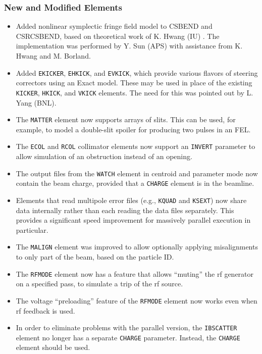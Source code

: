 \documentclass[11pt]{article}
\begin{document}
\subsubsection{New and Modified Elements}
\begin{itemize}
\item Added nonlinear symplectic fringe field model to CSBEND and CSRCSBEND, based on theoretical work of K. Hwang (IU) \cite{KHwang}. The implementation was
  performed by Y. Sun (APS) with assistance from K. Hwang and M. Borland.
\item Added \verb|EKICKER|, \verb|EHKICK|, and \verb|EVKICK|, which provide various flavors of steering correctors using an Exact 
  model. These may be used in place of the existing \verb|KICKER|, \verb|HKICK|, and \verb|VKICK| elements.
  The need for this was pointed out by L. Yang (BNL).
\item The \verb|MATTER| element now supports arrays of slits. This can be used, for example, to model a double-slit spoiler for
  producing two pulses in an FEL.
\item The \verb|ECOL| and \verb|RCOL| collimator elements now support an \verb|INVERT| parameter to allow simulation of an
  obstruction instead of an opening.
\item The output files from the \verb|WATCH| element in centroid and parameter mode now contain the beam charge, provided that
  a \verb|CHARGE| element is in the beamline.
\item Elements that read multipole error files (e.g., \verb|KQUAD| and \verb|KSEXT|) now share data internally rather than each
  reading the data files separately. This provides a significant speed improvement for massively parallel execution in particular.
\item The \verb|MALIGN| element was improved to allow optionally applying misalignments to only part of the beam, based on 
  the particle ID.
\item The \verb|RFMODE| element now has a feature that allows ``muting'' the rf generator on a specified pass, to simulate
  a trip of the rf source. 
\item The voltage ``preloading'' feature of the \verb|RFMODE| element now works even when rf feedback is used.
\item In order to eliminate problems with the parallel version, the \verb|IBSCATTER| element no longer has a separate \verb|CHARGE| parameter. 
  Instead, the \verb|CHARGE| element should be used.
\end{itemize}
\end{document}
